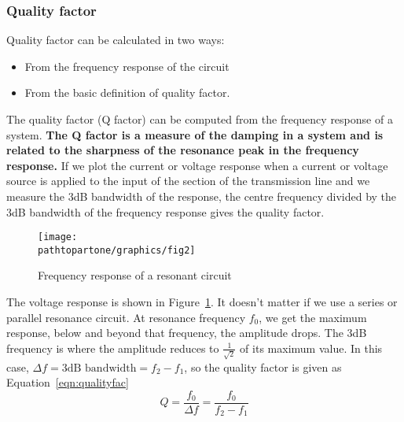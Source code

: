 \subsubsection{Quality factor}
Quality factor can be calculated in two ways:
\begin{itemize}
\item From the frequency response of the circuit
\item From the basic definition of quality factor.
\end{itemize}
The quality factor (Q factor) can be computed from the frequency response of a system. \textbf{The Q factor is a measure of the damping in a system and is related to the sharpness of the resonance peak in the frequency response.} If we plot the current or voltage response when a current or voltage source is applied to the input of the section of the transmission line and we measure the 3dB bandwidth of the response, the centre frequency divided by the 3dB bandwidth of the frequency response gives the quality factor.
\begin{figure}[h]
\centering
\texttt{[image: \\pathtopartone/graphics/fig2]}
\caption{Frequency response of a resonant circuit}
\label{fig:fig2}
\end{figure}

The voltage response is shown in Figure~\ref{fig:fig2}. It doesn't matter if we use a series or parallel resonance circuit. At resonance frequency $ f_0 $, we get the maximum response, below and beyond that frequency, the amplitude drops. The 3dB frequency is where the amplitude reduces to $ \frac{1}{\sqrt{2}} $ of its maximum value. In this case, $ \Delta f=3\text{dB bandwidth} =f_{2}-f_{1} $, so the quality factor is given as Equation~\eqref{eqn:qualityfac}
\begin{equation}
Q=\frac{f_0}{\Delta f}=\frac{f_0}{f_{2}-f_{1}}
\label{eqn:qualityfac}
\end{equation} 

